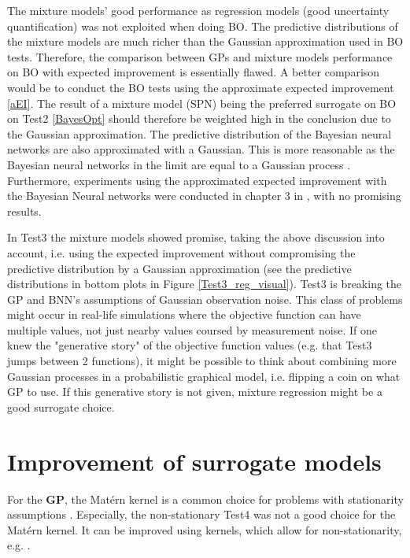 The mixture models' good performance as regression models (good uncertainty quantification) was not
exploited when doing BO. The predictive distributions of the mixture models are much richer than the
Gaussian approximation used in BO tests. Therefore, the comparison between GPs and mixture models
performance on BO with expected improvement is essentially flawed. A better comparison would be to
conduct the BO tests using the approximate expected improvement \eqref{aEI}. The result of a mixture
model (SPN) being the preferred surrogate on BO on Test2 \ref{BayesOpt} should therefore be weighted
high in the conclusion due to the Gaussian approximation. The predictive distribution of the
Bayesian neural networks are also approximated with a Gaussian. This is more reasonable as the
Bayesian neural networks in the limit are equal to a Gaussian process \cite{BNN_GP}. Furthermore,
experiments using the approximated expected improvement with the Bayesian Neural networks were
conducted in chapter 3 in \cite{PhDthesis}, with no promising results. 

In Test3 the mixture models showed promise, taking the above discussion into account, i.e. using the
expected improvement without compromising the predictive distribution by a Gaussian approximation
(see the predictive distributions in bottom plots in Figure \ref{Test3_reg_visual}). Test3 is
breaking the GP and BNN's assumptions of Gaussian observation noise. This class of problems might
occur in real-life simulations where the objective function can have multiple values, not just
nearby values coursed by measurement noise. If one knew the "generative story" of the objective
function values (e.g. that Test3 jumps between 2 functions), it might be possible to think about
combining more Gaussian processes in a probabilistic graphical model, i.e. flipping a coin on what
GP to use. If this generative story is not given, mixture regression might be a good surrogate
choice. 

\section{Improvement of surrogate models}
For the \textbf{GP}, the Matérn kernel is a common choice for problems with
stationarity assumptions \cite{TakeHumanOutOfLoop}. Especially, the non-stationary Test4 was not a
good choice for the Matérn kernel. It can be improved using kernels, which allow for non-stationarity, 
e.g. \cite{DeepKernelLearning}. 

